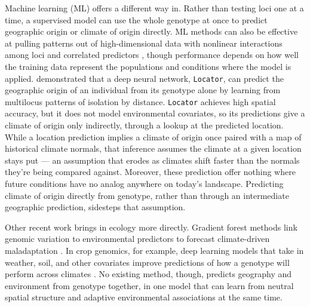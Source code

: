 \documentclass[]{article}
\begin{document}
Machine learning (ML) offers a different way in.
Rather than testing loci one at a time, a supervised model
can use the whole genotype at once to predict
geographic origin or climate of origin directly.
ML methods can also be effective at pulling patterns
out of high-dimensional data with nonlinear interactions among loci
and correlated predictors
\citep{schrider_supervised_2018}, though performance depends 
on how well the training data represent the populations and 
conditions where the model is applied.
\citet{battey_predicting_2020} demonstrated
that a deep neural network, \texttt{Locator}, can predict
the geographic origin of an individual from its genotype alone
by learning from multilocus patterns of isolation by distance.
\texttt{Locator} achieves high spatial accuracy,
but it does not model environmental covariates,
so its predictions give a climate of origin only indirectly, 
through a lookup at the predicted location. While
a location prediction implies a climate of origin once 
paired with a map of historical climate normals, 
that inference assumes the climate at a given location 
stays put — an assumption that erodes as climates shift 
faster than the normals they're being compared against.
Moreover, these prediction offer nothing where future conditions 
have no analog anywhere on today's landscape. 
Predicting climate of origin directly from genotype, 
rather than through an intermediate geographic prediction, 
sidesteps that assumption.

Other recent work brings in ecology more directly.
Gradient forest methods link genomic variation
to environmental predictors to forecast
climate-driven maladaptation \citep{fitzpatrick_experimental_2021}. %
In crop genomics, for example, deep learning models that take in weather, soil,
and other covariates improve predictions of how a genotype will perform
across climates
\citep{washburn_predicting_2021, montesinoslopez_review_2021}.
No existing method, though, predicts geography and environment
from genotype together, in one model that can learn from
neutral spatial structure and adaptive environmental associations at the same time.
\end{document}
